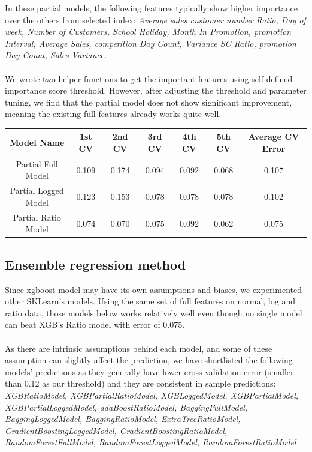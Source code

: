\documentclass{article}
\begin{document}
In these partial models, the following features typically show higher importance over the others from selected index: \textit{Average sales customer number Ratio, Day of week, Number of Customers, School Holiday, Month In Promotion, promotion Interval, Average Sales, competition Day Count, Variance SC Ratio, promotion Day Count, Sales Variance.}\\
\\
We wrote two helper functions to get the important features using self-defined importance score threshold. However, after adjusting the threshold and parameter tuning, we find that the partial model does not show significant improvement, meaning the existing full features already works quite well. 

\begin{center}
 \begin{tabular}{||c c c c c c c||} 
 \hline
 Model Name & 1st CV & 2nd CV & 3rd CV & 4th CV & 5th CV & Average CV Error \\ [0.5ex] 
 \hline\hline
 Partial Full Model & 0.109 & 0.174 & 0.094 & 0.092 & 0.068 & 0.107 \\ 
 \hline
 Partial Logged Model & 0.123 & 0.153 & 0.078 & 0.078 & 0.078 & 0.102 \\ 
 \hline
 Partial Ratio Model & 0.074 & 0.070 & 0.075 & 0.092 & 0.062 & 0.075 \\ [1ex] 
 \hline
\end{tabular}
\end{center}

\subsection{Ensemble regression method}

Since xgboost model may have its own assumptions and biases, we experimented other SKLearn’s models. Using the same set of full features on normal, log and ratio data, those models below works relatively well even though no single model can beat XGB’s Ratio model with error of 0.075.\\
\\
As there are intrinsic assumptions behind each model, and some of these assumption can slightly affect the prediction, we have shortlisted the following models’ predictions as they generally have lower cross validation error (smaller than 0.12 as our threshold) and they are consistent in sample predictions: \\

\textit{XGBRatioModel, XGBPartialRatioModel, XGBLoggedModel, XGBPartialModel, XGBPartialLoggedModel, adaBoostRatioModel, BaggingFullModel, BaggingLoggedModel, BaggingRatioModel, ExtraTreeRatioModel, GradientBoostingLoggedModel, GradientBoostingRatioModel, RandomForestFullModel, RandomForestLoggedModel, RandomForestRatioModel}\\
\end{document}
